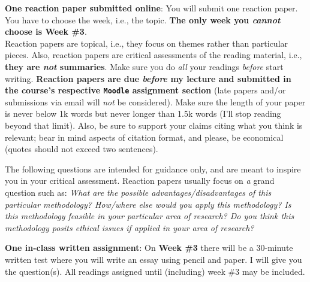 \documentclass[letterpaper]{article}
\renewenvironment{itemize}{
  \begin{list}{}{
    \setlength{\leftmargin}{1.5em}
  }
}{
  \end{list}
}
\begin{document}
\begin{enumerate}
  \item {\bf One reaction paper submitted online}: You will submit one reaction paper. You have to choose the week, i.e., the topic. {\bf The only week you \emph{cannot} choose is Week \#3}.\\

  Reaction papers are topical, i.e., they focus on themes rather than particular pieces. Also, reaction papers are critical assessments of the reading material, i.e., {\bf they are \emph{not} summaries}. Make sure you do \emph{all} your readings \emph{before} start writing. {\bf Reaction papers are due \emph{before} my lecture and submitted in the course's respective \texttt{Moodle} assignment section} (late papers and/or submissions via email will \emph{not} be considered). Make sure the length of your paper is never below 1k words but never longer than 1.5k words (I'll stop reading beyond that limit). Also, be sure to support your claims citing what you think is relevant; bear in mind aspects of citation format, and please, be economical (quotes should not exceed two sentences).


  \begin{itemize}
    \item[\Pointinghand] The following questions are intended for guidance only, and are meant to inspire you in your critical assessment. Reaction papers usually focus on \emph{a} grand question such as: \emph{What are the possible advantages/disadvantages of this particular methodology? How/where else would you apply this methodology? Is this methodology feasible in your particular area of research? Do you think this methodology posits ethical issues if applied in your area of research?}
  \end{itemize}
  
  \item {\bf One in-class written assignment}: On {\bf Week \#3} there will be a 30-minute written test where you will write an essay using pencil and paper. I will give you the question(s). All readings assigned until (including) week \#3 may be included.




\end{enumerate}
\end{document}
